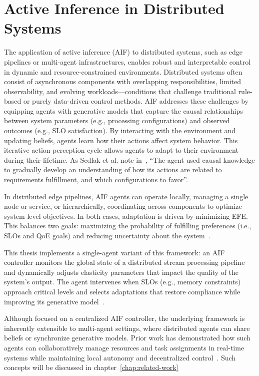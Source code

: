 \section{Active Inference in Distributed Systems}
The application of active inference (AIF) to distributed systems, such as edge pipelines or multi-agent infrastructures, enables robust and interpretable control in dynamic and resource-constrained environments. Distributed systems often consist of asynchronous components with overlapping responsibilities, limited observability, and evolving workloads—conditions that challenge traditional rule-based or purely data-driven control methods. AIF addresses these challenges by equipping agents with generative models that capture the causal relationships between system parameters (e.g., processing configurations) and observed outcomes (e.g., SLO satisfaction). By interacting with the environment and updating beliefs, agents learn how their actions affect system behavior. This iterative action-perception cycle allows agents to adapt to their environment during their lifetime. As Sedlak et al. note in~\cite{sedlak_active_2024}, “The agent used causal knowledge to gradually develop an understanding of how its actions are related to requirements fulfillment, and which configurations to favor”.

In distributed edge pipelines, AIF agents can operate locally, managing a single node or service, or hierarchically, coordinating across components to optimize system-level objectives. In both cases, adaptation is driven by minimizing EFE. This balances two goals: maximizing the probability of fulfilling preferences (i.e., SLOs and QoE goals) and reducing uncertainty about the system~\cite{friston_free-energy_2010, lanillos_active_2021}. 

This thesis implements a single-agent variant of this framework: an AIF controller monitors the global state of a distributed stream processing pipeline and dynamically adjusts elasticity parameters that impact the quality of the system's output. The agent intervenes when SLOs (e.g., memory constraints) approach critical levels and selects adaptations that restore compliance while improving its generative model~\cite{sedlak_equilibrium_2024}.

Although focused on a centralized AIF controller, the underlying framework is inherently extensible to multi-agent settings, where distributed agents can share beliefs or synchronize generative models. Prior work has demonstrated how such agents can collaboratively manage resources and task assignments in real-time systems while maintaining local autonomy and decentralized control~\cite{sedlak_slo-aware_2025}. Such concepts will be discussed in chapter~\ref{chap:related-work}
